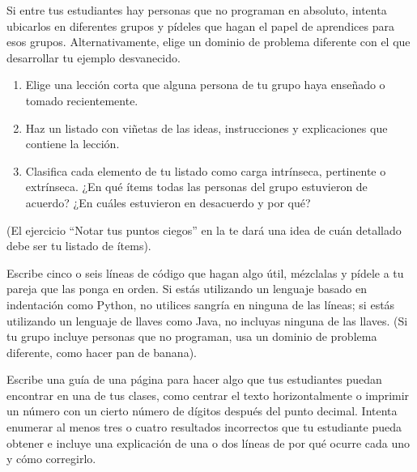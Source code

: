 Si entre tus estudiantes hay personas que no programan en absoluto,
intenta ubicarlos en diferentes grupos
y pídeles que hagan el papel de aprendices para esos grupos.
Alternativamente,
elige un dominio de problema diferente con el que desarrollar tu ejemplo desvanecido.



\begin{enumerate}

\item
  Elige una lección corta que alguna persona de tu grupo haya enseñado o tomado recientemente.

\item
  Haz un listado con viñetas de las ideas, instrucciones y explicaciones que contiene la lección.

\item
  Clasifica cada elemento de tu listado como carga intrínseca, pertinente o extrínseca.
  ¿En qué ítems todas las personas del grupo estuvieron de acuerdo?
  ¿En cuáles estuvieron en desacuerdo y por qué?

\end{enumerate}

(El ejercicio ``Notar tus puntos ciegos'' en la 
te dará una idea de cuán detallado debe ser tu listado de ítems).



Escribe cinco o seis líneas de código que hagan algo útil,
mézclalas y pídele a tu pareja que las ponga en orden.
Si estás utilizando un lenguaje basado en indentación como Python,
no utilices sangría en ninguna de las líneas;
si estás utilizando un lenguaje de llaves como Java,
no incluyas ninguna de las llaves.
(Si tu grupo incluye personas que no programan,
usa un dominio de problema diferente,
como hacer pan de banana).



Escribe una guía de una página para hacer algo que tus estudiantes puedan encontrar en una de tus clases,
como centrar el texto horizontalmente
o imprimir un número con un cierto número de dígitos después del punto decimal.
Intenta enumerar al menos tres o cuatro resultados incorrectos que tu estudiante pueda obtener
e incluye una explicación de una o dos líneas
de por qué ocurre cada uno y cómo corregirlo.



